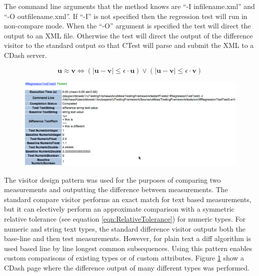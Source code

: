 \documentclass{InsightArticle}
\begin{document}
The command line arguments that the  method knows are ``-I infilename.xml'' and ``-O outfilename.xml''. If ``-I'' is not specified then the regression test will run in non-compare mode. When the ``-O'' argument is specified the test will direct the output to an XML file. Otherwise the test will direct the output of the difference visitor to the standard output so that CTest will parse and submit the XML to a CDash server.


\begin{equation}
\label{eqn:RelativeTolerance}
\mathbf{u}\approx \mathbf{v}\iff\left(\left|\mathbf{u}-\mathbf{v}\right|\leq\epsilon\cdot\mathbf{u}\right) \lor \left(\left|\mathbf{u}-\mathbf{v}\right|\leq\epsilon\cdot\mathbf{v}\right)
\end{equation}


\begin{figure}
\center
\includegraphics[width=.9\textwidth]{CDashDisplay.eps}
\label{fig:CDashDisplay}
\end{figure}


The visitor design pattern was used for the purposes of comparing two measurements and outputting the difference between measurements. The standard compare visitor performs an exact match for text based measurements, but it can electively perform an approximate comparison with a symmetric relative tolerance (see equation \ref{eqn:RelativeTolerance}) for numeric types. For numeric and string text types, the standard difference visitor outputs both the base-line and then test measurements. However, for plain text a diff algorithm is used based line by line longest common subsequences. Using this pattern enables custom comparisons of existing types or of custom  attributes. Figure \ref{fig:CDashDisplay} show a CDash page where the difference output of many different types was performed. 
\end{document}
